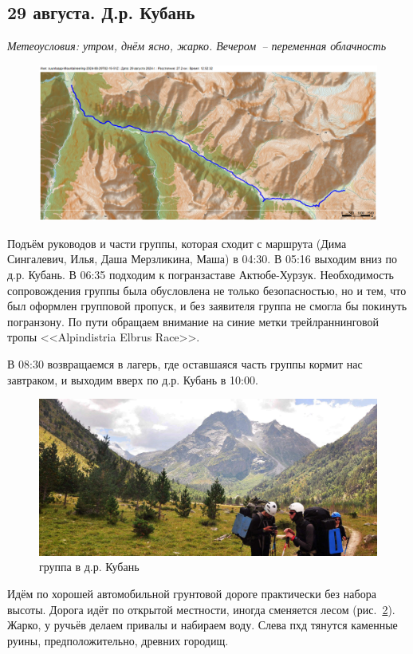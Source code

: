 \subsection{29 августа. Д.р. Кубань}
\textit{Метеоусловия: утром, днём ясно, жарко. Вечером~-- переменная облачность}

\begin{figure}[h!]
	\centering
	\includegraphics[angle=0, width=0.7\linewidth]{../pics/mini_maps/29}
	\label{fig:mini_29}
\end{figure}


Подъём руководов и части группы, которая сходит с маршрута (Дима Сингалевич, Илья, Даша Мерзликина, Маша) в 04:30. В 05:16 выходим вниз по д.р. Кубань. В 06:35 подходим к погранзаставе Актюбе-Хурзук. Необходимость сопровождения группы была обусловлена не только безопасностью, но и тем, что был оформлен групповой пропуск, и без заявителя группа не смогла бы покинуть погранзону. По пути обращаем внимание на синие метки трейлраннинговой тропы <<Alpindistria Elbrus Race>>.

В 08:30 возвращаемся в лагерь, где оставшаяся часть группы кормит нас завтраком, и выходим вверх по д.р. Кубань в 10:00.

\begin{figure}[h!]
	\centering
	\includegraphics[width=0.7\linewidth]{../pics/DSC_0462 2.JPG}
	\caption{группа в д.р. Кубань}
	\label{fig:DSC_0462 2.JPG}
\end{figure}

Идём по хорошей автомобильной грунтовой дороге практически без набора высоты. Дорога идёт по открытой местности, иногда сменяется лесом (рис.~\ref{fig:DSC_0462 2.JPG}). Жарко, у ручьёв делаем привалы и набираем воду. Слева пхд тянутся каменные руины, предположительно, древних городищ.


